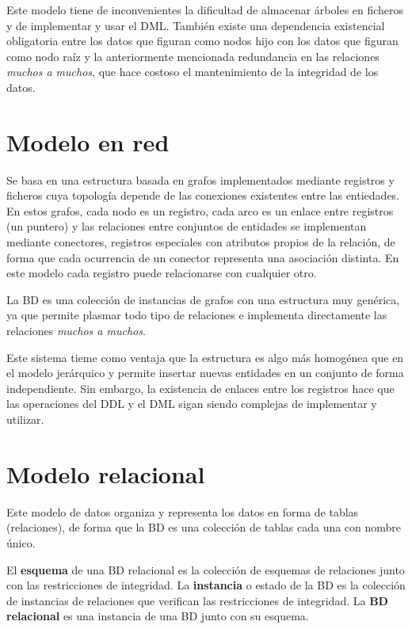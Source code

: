 Este modelo tiene de inconvenientes la dificultad de almacenar árboles en ficheros y de implementar y usar el DML\@.
También existe una dependencia existencial obligatoria entre los datos que figuran como nodos hijo con los datos que figuran como nodo raíz y la anteriormente mencionada redundancia en las relaciones \textit{muchos a muchos}, que hace costoso el mantenimiento de la integridad de los datos.

\section{Modelo en red}

Se basa en una estructura basada en grafos implementados mediante registros y ficheros cuya topología depende de las conexiones existentes entre las entiedades.
En estos grafos, cada nodo es un registro, cada arco es un enlace entre registros (un puntero) y las relaciones entre conjuntos de entidades se implementan mediante conectores, registros especiales con atributos propios de la relación, de forma que cada ocurrencia de un conector representa una asociación distinta.
En este modelo cada registro puede relacionarse con cualquier otro.

La BD es una colección de instancias de grafos con una estructura muy genérica, ya que permite plasmar todo tipo de relaciones e implementa directamente las relaciones \textit{muchos a muchos}.

Este sistema tieme como ventaja que la estructura es algo más homogénea que en el modelo jerárquico y permite insertar nuevas entidades en un conjunto de forma independiente.
Sin embargo, la existencia de enlaces entre los registros hace que las operaciones del DDL y el DML sigan siendo complejas de implementar y utilizar.

\section{Modelo relacional}

Este modelo de datos organiza y representa los datos en forma de tablas (relaciones), de forma que la BD es una colección de tablas cada una con nombre único.

El \textbf{esquema} de una BD relacional es la colección de esquemas de relaciones junto con las restricciones de integridad.
La \textbf{instancia} o estado de la BD es la colección de instancias de relaciones que verifican las restricciones de integridad.
La \textbf{BD relacional} es una instancia de una BD junto con su esquema.

